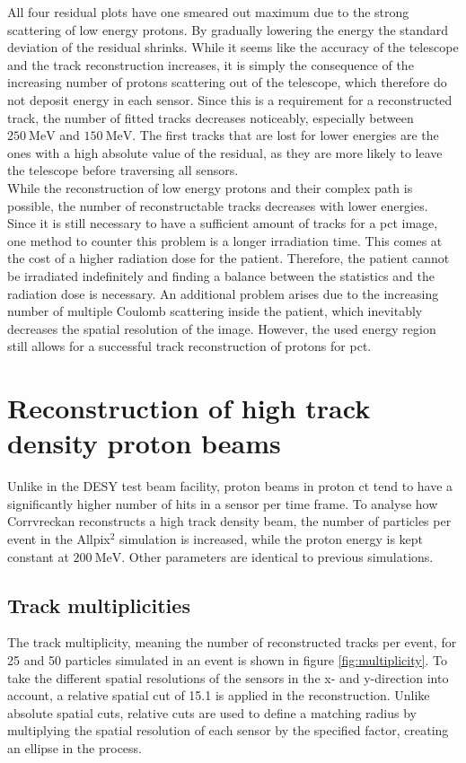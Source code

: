 All four residual plots have one smeared out maximum due to the strong scattering of low energy protons. By gradually lowering the energy the standard deviation of the residual shrinks. While
it seems like the accuracy of the telescope and the track reconstruction increases, it is simply the consequence of the increasing number of protons scattering
out of the telescope, which therefore do not deposit energy in each sensor. Since this is a requirement for a reconstructed track, the number of fitted tracks decreases
noticeably, especially between $\SI{250}{\mega\eV}$ and $\SI{150}{\mega\eV}$. The first tracks that are lost for lower energies
are the ones with a high absolute value of the residual, as they are more likely to leave the telescope before traversing all sensors. \\
While the reconstruction of low energy protons and their complex path is possible, the number of reconstructable tracks decreases with lower energies.
Since it is still necessary to have a sufficient amount of tracks for a pct image, one method to counter this problem is a longer irradiation time.
This comes at the cost of a higher radiation dose for the patient. Therefore, the patient cannot be irradiated indefinitely and finding a balance between the statistics and the
radiation dose is necessary.
An additional problem arises due to the increasing number of multiple Coulomb scattering inside the patient, which inevitably decreases the spatial resolution of the image.
However, the used energy region still allows for a successful track reconstruction of protons for pct.


\chapter{Reconstruction of high track density proton beams}\label{sec:density}
Unlike in the DESY test beam facility, proton beams in proton ct tend to have a significantly higher number of hits in a sensor
per time frame. To analyse how Corrvreckan reconstructs a high track density beam, the number of particles per event in the Allpix$^2$
simulation is increased, while the proton energy is kept constant at $\SI{200}{\mega\eV}$. Other parameters are identical to previous simulations.

\section{Track multiplicities}
The track multiplicity, meaning the number of reconstructed tracks per event, for 25 and 50 particles simulated in an event is shown in figure \ref{fig:multiplicity}. To take the different spatial resolutions of the sensors in the x- and y-direction into account, a relative
spatial cut of 15.1 is applied in the reconstruction. Unlike absolute spatial cuts, relative cuts are used to define a
matching radius by multiplying the spatial resolution
of each sensor by the specified factor, creating an ellipse in the process.

